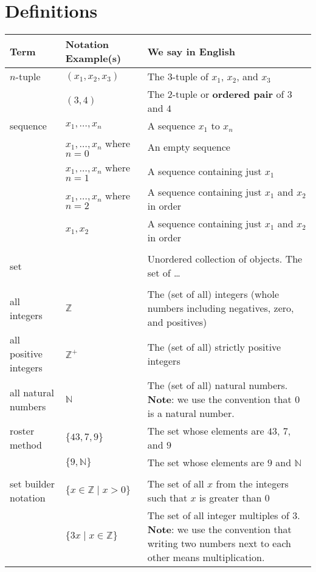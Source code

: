 \documentclass[12pt, oneside]{article}
\begin{document}
\begin{flushright}
\end{flushright} \section*{Definitions}


\begin{center}
\begin{tabular}{|llp{9cm}|}
\hline
Term & Notation Example(s) & We say in English \\
\hline
$n$-tuple & $(x_1, x_2, x_3)$ & The 3-tuple of $x_1$, $x_2$, and $x_3$ \\
          & $(3, 4)$ & The 2-tuple or {\bf ordered pair} of $3$ and $4$ \\

sequence & $x_1, \ldots, x_n$ & A sequence $x_1$ to $x_n$ \\
         & $x_1, \ldots, x_n$ where $n = 0$ & An empty sequence \\
         & $x_1, \ldots, x_n$ where $n = 1$ & A sequence containing just $x_1$ \\
         & $x_1, \ldots, x_n$ where $n = 2$ & A sequence containing just $x_1$ and $x_2$ in order \\
         & $x_1, x_2$ & A sequence containing just $x_1$ and $x_2$ in order \\
&&\\
set & & Unordered collection of objects. The set of \ldots \\
&&\\
all integers & $\mathbb{Z}$ & The (set of all) integers (whole numbers including negatives, zero, and positives) \\
all positive integers & $\mathbb{Z}^+$ & The (set of all) strictly positive integers \\
all natural numbers & $\mathbb{N}$ & The (set of all) natural numbers. {\bf Note}: we use the convention that $0$ is a natural number. \\
roster method & $\{43, 7, 9\}$ & The set whose elements are $43$, $7$, and $9$\\
              & $\{9, \mathbb{N}\}$ & The set whose elements are $9$ and $\mathbb{N}$\\

&&\\

set builder notation & $\{ x \in \mathbb{Z} \mid x > 0\}$ & The set of all $x$ from the integers such that $x$ is greater than $0$ \\
                     & $\{ 3x  \mid x \in \mathbb{Z} \}$ & The set of all integer multiples of $3$. {\bf Note}: we use the convention that writing two numbers next to each other means multiplication. \\


\end{tabular}
\end{center}
\end{document}
